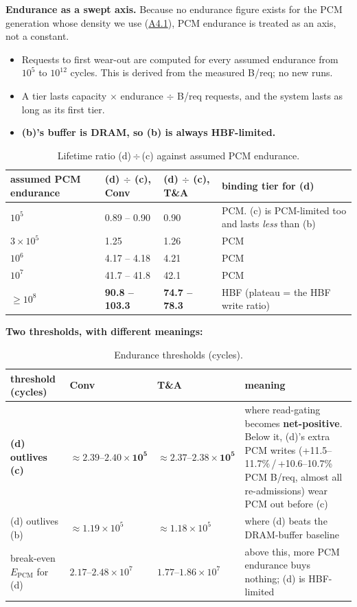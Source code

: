 \documentclass[11pt,a4paper]{article}
\newcommand{\hd}[1]{\textbf{#1}}
\begin{document}
\textbf{Endurance as a swept axis.} Because no endurance figure exists for the
PCM generation whose density we use (\hyperref[sec:lit]{A4.1}), PCM endurance
is treated as an axis, not a constant.
\begin{itemize}
  \item Requests to first wear-out are computed for every assumed endurance
    from $10^{5}$ to $10^{12}$ cycles. This is derived from the measured
    B/req; no new runs.
  \item A tier lasts capacity $\times$ endurance $\div$ B/req requests, and
    the system lasts as long as its first tier.
  \item \textbf{(b)'s buffer is DRAM, so (b) is always HBF-limited.}
\end{itemize}

\begin{xltabular}{\linewidth}{@{}P{30mm} Y{0.7} Y{0.6} Y{1.7}@{}}
\caption{Lifetime ratio (d)\,$\div$\,(c) against assumed PCM endurance.}\label{tab:sweep}\\
\toprule
\hd{assumed PCM endurance} & \hd{(d) $\div$ (c), Conv} & \hd{(d) $\div$ (c), T\&A} & \hd{binding tier for (d)} \\
\midrule
$10^{5}$ & 0.89 -- 0.90 & 0.90 & PCM. (c) is PCM-limited too and lasts \emph{less} than (b) \\
$3 \times 10^{5}$ & 1.25 & 1.26 & PCM \\
$10^{6}$ & 4.17 -- 4.18 & 4.21 & PCM \\
$10^{7}$ & 41.7 -- 41.8 & 42.1 & PCM \\
$\ge 10^{8}$ & \textbf{90.8 -- 103.3} & \textbf{74.7 -- 78.3} & HBF (plateau = the HBF write ratio) \\
\bottomrule
\end{xltabular}

\textbf{Two thresholds, with different meanings:}

\begin{xltabular}{\linewidth}{@{}P{30mm} Y{0.7} Y{0.7} Y{1.6}@{}}
\caption{Endurance thresholds (cycles).}\label{tab:thresholds}\\
\toprule
\hd{threshold (cycles)} & \hd{Conv} & \hd{T\&A} & \hd{meaning} \\
\midrule
\textbf{(d) outlives (c)} & $\boldsymbol{\approx 2.39\text{--}2.40 \times 10^{5}}$ & $\boldsymbol{\approx 2.37\text{--}2.38 \times 10^{5}}$
  & where read-gating becomes \textbf{net-positive}. Below it, (d)'s extra PCM writes (+11.5--11.7\%\,/\,+10.6--10.7\% PCM B/req, almost all re-admissions) wear PCM out before (c) \\
(d) outlives (b) & $\approx 1.19 \times 10^{5}$ & $\approx 1.18 \times 10^{5}$ & where (d) beats the DRAM-buffer baseline \\
break-even $E_\text{PCM}$ for (d) & $2.17\text{--}2.48 \times 10^{7}$ & $1.77\text{--}1.86 \times 10^{7}$ & above this, more PCM endurance buys nothing; (d) is HBF-limited \\
\bottomrule
\end{xltabular}
\end{document}
